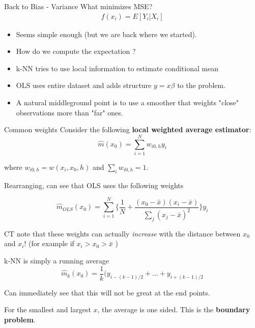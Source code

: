 \begin{frame}{Back to Bias - Variance}
What minimizes MSE?
\begin{eqnarray*}
f(x_i) = E[Y_i | X_i] 
\end{eqnarray*}
\begin{itemize}
\item Seems simple enough (but we are back where we started).
\item How do we compute the expectation ?
\item k-NN tries to use local information to estimate conditional mean
\item OLS uses entire dataset and adds structure $ y = x \beta$ to the problem.
\item A natural middleground point is to use a smoother that weights "close" observations more than "far" ones. 
\end{itemize}
\end{frame}

\begin{frame}{Common weights}
  Consider the following \textbf{local weighted average estimator}: 
   $$ \hat m(x_0) = \sum_{i=1}^{N} w_{i0,h}y_i$$

   where $w_{i0,h} = w(x_i,x_0,h)$ and $\sum_i  w_{i0,h} = 1$. 

\pause 

  Rearranging, can see that OLS uses the following weights

  $$ \hat m_{OLS}(x_0) = \sum_{i=1}^{N} \lbrace \frac{1}{N} + \frac{ (x_0 - \bar{x}) (x_i - \bar{x})}{\sum_j (x_j - \bar{x})^2} \rbrace y_i $$

  CT note that these weights can actually \textit{increase} with the distance between $x_0$ and $x_i$! 
  (for example if $x_i > x_0 > \bar{x}$ )
  
\end{frame}

\begin{frame}{k-NN is simply a running average}
  $$ \hat m_k(x_0) = \frac{1}{k}(y_{i-(k-1)/2} + ... + y_{i+(k-1)/2}$$

  Can immediately see that this will not be great at the end points. 
  
  For the smallest and largest $x$, the average is one sided. This is the \textbf{boundary problem}. 

\end{frame}

